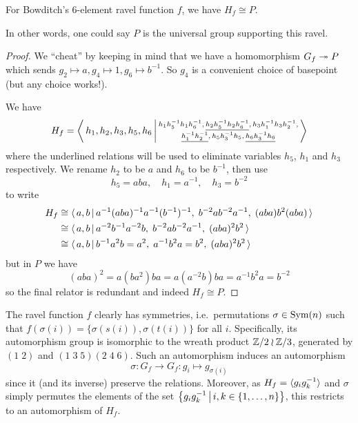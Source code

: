 \begin{lemma}
    For Bowditch's $6$-element ravel function $f$, we have $H_f \cong P$.
\end{lemma}

In other words, one could say $P$ is the universal group supporting this ravel.

\begin{proof}
    We ``cheat'' by keeping in mind that we have a homomorphism $G_f \twoheadrightarrow P$ which sends $g_2 \mapsto a, g_4 \mapsto 1, g_6 \mapsto b^{-1}$.
    So $g_4$ is a convenient choice of basepoint (but any choice works!).

    We have \[
        H_f = \left\langle \, h_1, h_2, h_3, h_5, h_6 \, \middle| \, 
            \substack{
                h_1 h_5^{-1} h_1 h_6^{-1}, \,
                \underline{h_2 h_5^{-1} h_2 h_6^{-1}}, \,
                h_3 h_1^{-1} h_3 h_2^{-1}, \\
                \underline{h_1^{-1} h_2^{-1}}, \,
                h_5 h_3^{-1} h_5, \,
                \underline{h_6 h_3^{-1} h_6}
            }
         \, \right\rangle
    \]
    where the underlined relations will be used to eliminate variables $h_5$, $h_1$ and $h_3$ respectively.
    We rename $h_2$ to be $a$ and $h_6$ to be $b^{-1}$, then use \[
        h_5 = a b a, \quad h_1 = a^{-1}, \quad h_3 = b^{-2}
    \] to write
    \begin{align*}
        H_f
        & \cong \langle \, a, b \, | \, a^{-1} (aba)^{-1} a^{-1} (b^{-1})^{-1}, \; b^{-2} a b^{-2} a^{-1}, \; (aba) b^2 (aba) \, \rangle \\
        & \cong \langle \, a, b \, | \, a^{-2} b^{-1} a^{-2} b, \; b^{-2} a b^{-2} a^{-1}, \; (aba)^2 b^2 \, \rangle \\
        & \cong \langle \, a, b \, | \, b^{-1} a^2 b = a^2, \; a^{-1} b^2 a = b^2, \; (aba)^2 b^2 \, \rangle
    \end{align*}
    but in $P$ we have \[
        (aba)^2 = a (ba^2) ba = a (a^{-2} b) ba = a^{-1} b^2 a = b^{-2}
    \] so the final relator is redundant and indeed $H_f \cong P$.
\end{proof}

The ravel function $f$ clearly has symmetries, i.e.\ permutations $\sigma \in \mathrm{Sym}(n)$ such that $f(\sigma(i)) = \{ \sigma(s(i)), \sigma(t(i))\}$ for all $i$.
Specifically, its automorphism group is isomorphic to the wreath product $\mathbb{Z}/2 \wr \mathbb{Z}/3$, generated by $(1 \; 2)$ and $(1 \; 3 \; 5)(2 \; 4 \; 6)$.
Such an automorphism induces an automorphism \[
    \sigma \colon G_f \to G_f \colon g_i \mapsto g_{\sigma(i)}
\] since it (and its inverse) preserve the relations.
Moreover, as $H_f = \langle g_i g_k^{-1} \rangle$ and $\sigma$ simply permutes the elements of the set $\left\{ g_i g_k^{-1} \,\middle|\,  i, k \in \{1, \dots, n\}  \right\}$, this restricts to an automorphism of $H_f$.

